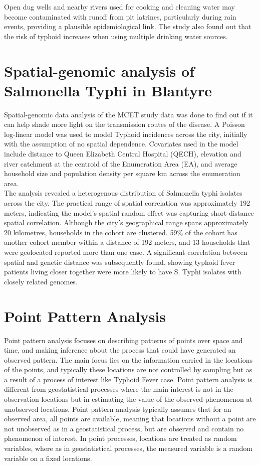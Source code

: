 \documentclass[a4paper]{thesis}
\begin{document}
Open dug wells and nearby rivers used for cooking and cleaning water may become contaminated with runoff from pit latrines, particularly during rain events, providing a plausible epidemiological link. The study also found out that the risk of typhoid increases when using multiple drinking water sources.

\section{Spatial-genomic analysis of Salmonella Typhi in Blantyre}

Spatial-genomic data analysis of the MCET study data was done to find out if it can help shade more light on the transmission routes of the disease. A Poisson log-linear model was used to model Typhoid incidences across the city, initially with the assumption of no spatial dependence. Covariates used in the model include distance to Queen Elizabeth Central Hospital (QECH), elevation and river catchment at the centroid of the Enumeration Area (EA), and average household size and population density per square km across the enumeration area.\\

The analysis revealed a heterogenous distribution of Salmonella typhi isolates across the city.\cite{Gauld2021} The practical range of spatial correlation was approximately 192 meters, indicating the model’s spatial random effect was capturing short-distance spatial correlation. Although the city$'$s geographical range spans approximately 20 kilometres, households in the cohort are clustered. 59\% of the cohort has another cohort member within a distance of 192 meters, and 13 households that were geolocated reported more than one case.  A significant correlation between spatial and genetic distance was subsequently found, showing typhoid fever patients living closer together were more likely to have S. Typhi isolates with closely related genomes.

\section{Point Pattern Analysis}

Point pattern analysis focuses on describing patterns of points over space and time, and making inference about the process that could have generated an observed pattern. The main focus lies on the information carried in the locations of the points, and typically these locations are not controlled by sampling but as a result of a process of interest like Typhoid Fever case. Point pattern analysis is different from geostatistical processes where the main interest is not in the observation locations but in estimating the value of the observed phenomenon at unobserved locations. Point pattern analysis typically assumes that for an observed area, all points are available, meaning that locations without a point are not unobserved as in a geostatistical process, but are observed and contain no phenomenon of interest. In point processes, locations are treated as random variables, where as in geostatistical processes, the measured variable is a random variable on a fixed locations.
\end{document}
